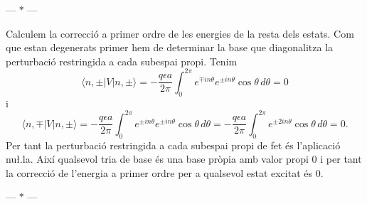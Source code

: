 \documentclass[12pt]{article}
\numberwithin{table}{section}
\numberwithin{figure}{section}
\newcommand{\ket}[1]{\vert {#1} \rangle}
\newcommand{\bra}[1]{\langle #1 \vert}
\newcommand{\parbreak}{
	\begin{center}
		--- $\ast$ ---
	\end{center} 
}
\begin{document}
\parbreak

Calculem la correcció a primer ordre de les energies de la resta dels estats. Com que estan degenerats primer hem de determinar la base que diagonalitza la perturbació restringida a cada subespai propi. Tenim
\begin{equation*}
	\bra{n,\pm} V \ket{n,\pm} = -\frac{q\epsilon a}{2\pi} \int_0^{2\pi} e^{\mp in\theta} e^{\pm in \theta} \cos{\theta} \,d\theta = 0
\end{equation*}
i
\begin{equation*}
	\bra{n,\mp} V \ket{n,\pm} = -\frac{q\epsilon a}{2\pi} \int_0^{2\pi} e^{\pm in\theta} e^{\pm in \theta} \cos{\theta} \,d\theta = -\frac{q\epsilon a}{2\pi} \int_0^{2\pi} e^{\pm 2in\theta} \cos{\theta} \,d\theta = 0.
\end{equation*}
Per tant la perturbació restringida a cada subespai propi de fet és l'aplicació nu\l.la. Així qualsevol tria de base és una base pròpia amb valor propi 0 i per tant la correcció de l'energia a primer ordre per a qualsevol estat excitat és 0. 

\parbreak
\end{document}
